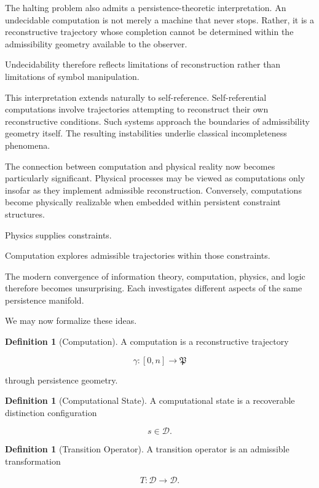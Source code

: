 \documentclass[12pt,oneside]{article}
\theoremstyle{definition}
\newtheorem{definition}[theorem]{Definition} \newtheorem{axiom}[theorem]{Axiom} \newtheorem{remark}[theorem]{Remark} \newtheorem{example}[theorem]{Example}
\begin{document}
The halting problem also admits a persistence-theoretic interpretation. An undecidable computation is not merely a machine that never stops. Rather, it is a reconstructive trajectory whose completion cannot be determined within the admissibility geometry available to the observer.

Undecidability therefore reflects limitations of reconstruction rather than limitations of symbol manipulation.

This interpretation extends naturally to self-reference. Self-referential computations involve trajectories attempting to reconstruct their own reconstructive conditions. Such systems approach the boundaries of admissibility geometry itself. The resulting instabilities underlie classical incompleteness phenomena.

The connection between computation and physical reality now becomes particularly significant. Physical processes may be viewed as computations only insofar as they implement admissible reconstruction. Conversely, computations become physically realizable when embedded within persistent constraint structures.

Physics supplies constraints.

Computation explores admissible trajectories within those constraints.

The modern convergence of information theory, computation, physics, and logic therefore becomes unsurprising. Each investigates different aspects of the same persistence manifold.

We may now formalize these ideas.

\begin{definition}[Computation]

A computation is a reconstructive trajectory

\[
\gamma
:
[0,n]
\rightarrow
\mathfrak P
\]

through persistence geometry.

\end{definition}

\begin{definition}[Computational State]

A computational state is a recoverable distinction configuration

\[
s \in \mathcal D.
\]

\end{definition}

\begin{definition}[Transition Operator]

A transition operator is an admissible transformation

\[
T :
\mathcal D
\rightarrow
\mathcal D.
\]

\end{definition}
\end{document}
